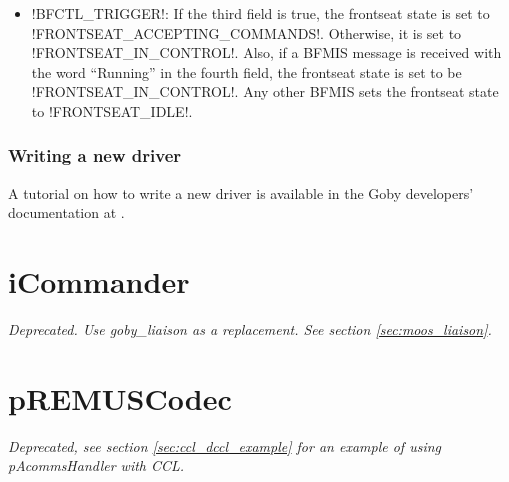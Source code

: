 \begin{itemize}
\begin{itemize}
\item !BFCTL_TRIGGER!: If the third field is true, the frontseat state is set to !FRONTSEAT_ACCEPTING_COMMANDS!. Otherwise, it is set to !FRONTSEAT_IN_CONTROL!. Also, if a BFMIS message is received with the word ``Running'' in the fourth field, the frontseat state is set to be !FRONTSEAT_IN_CONTROL!.  Any other BFMIS sets the frontseat state to !FRONTSEAT_IDLE!.
\end{itemize} 
\end{itemize}


\subsubsection{Writing a new driver}

A tutorial on how to write a new driver is available in the Goby developers' documentation at \cite{goby-doc}.


\section{iCommander}\label{sec:icommander} 

\textit{Deprecated. Use goby\_liaison as a replacement. See section \ref{sec:moos_liaison}.}

\section{pREMUSCodec}

\textit{Deprecated, see section \ref{sec:ccl_dccl_example} for an example of using pAcommsHandler with CCL.}

\DeleteShortVerb{\!}
